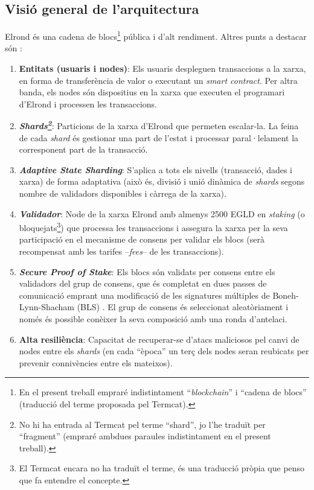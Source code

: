 \documentclass[11pt,a4paper]{article}
\begin{document}
\subsection{Visió general de l'arquitectura}
Elrond és una cadena de blocs\footnote{En el present treball empraré indistintament ``\textit{blockchain}'' i ``cadena de blocs'' (traducció del terme proposada pel Termcat).} pública i d'alt rendiment. Altres punts a destacar són \cite{elrond2022}\cite{elrond2022-2}:
\begin{enumerate}
  \item \textbf{Entitats (usuaris i nodes)}: Els usuaris despleguen transaccions a la xarxa, en forma de transferència de valor o executant un \textit{smart contract}. Per altra banda, els nodes són dispositius en la xarxa que executen el programari d'Elrond i processen les transaccions.
  \item \textbf{\textit{Shards\footnote{No hi ha entrada al Termcat pel terme ``shard'', jo l'he traduït per ``fragment'' (empraré ambdues paraules indistintament en el present treball).}}}: Particions de la xarxa d'Elrond que permeten escalar-la. La feina de cada \textit{shard} és gestionar una part de l'estat i processar paral·lelament la corresponent part de la transacció.
  \item \textbf{\textit{Adaptive State Sharding}}: S'aplica a tots els nivells (transacció, dades i xarxa) de forma adaptativa (això és, divisió i unió dinàmica de \textit{shards} segons nombre de validadors disponibles i càrrega de la xarxa).
  \item \textbf{\textit{Validador}}: Node de la xarxa Elrond amb almenys 2500 EGLD en \textit{staking} (o bloquejats\footnote{El Termcat encara no ha traduït el terme, és una traducció pròpia que penso que fa entendre el concepte.}) que processa les transaccions i assegura la xarxa per la seva participació en el mecanisme de consens per validar els blocs (serà recompensat amb les tarifes –\textit{fees}– de les transaccions).
  \item \textbf{\textit{Secure Proof of Stake}}: Els blocs són validats per consens entre els validadors del grup de consens, que és completat en dues passes de comunicació emprant una modificació de les signatures múltiples de Boneh-Lynn-Shacham (BLS) \cite{Boneh2004}. El grup de consens és seleccionat aleatòriament i només és possible conèixer la seva composició amb una ronda d'antelaci.
  \item \textbf{Alta resiliència}: Capacitat de recuperar-se d'atacs maliciosos pel canvi de nodes entre els \textit{shards} (en cada ``època'' un terç dels nodes seran reubicats per prevenir connivències entre els mateixos).

\end{enumerate}
\end{document}
